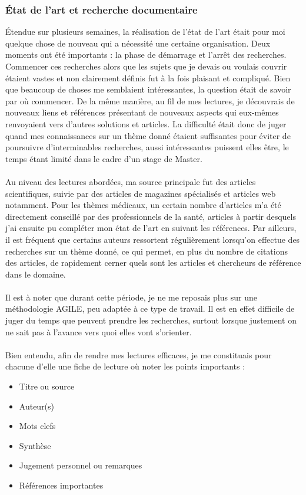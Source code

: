 	\subsubsection{État de l'art et recherche documentaire}
Étendue sur plusieurs semaines, la réalisation de l'état de l'art était pour moi quelque chose de nouveau qui a nécessité une certaine organisation. Deux moments ont été importants : la phase de démarrage et l'arrêt des recherches. Commencer ces recherches alors que les sujets que je devais ou voulais couvrir étaient vastes et non clairement définis fut à la fois plaisant et compliqué. Bien que beaucoup de choses me semblaient intéressantes, la question était de savoir par où commencer. De la même manière, au fil de mes lectures, je découvrais de nouveaux liens et références présentant de nouveaux aspects qui eux-mêmes renvoyaient vers d'autres solutions et articles. La difficulté était donc de juger quand mes connaissances sur un thème donné étaient suffisantes pour éviter de poursuivre d'interminables recherches, aussi intéressantes puissent elles être, le temps étant limité dans le cadre d'un stage de Master.

	\paragraph{}Au niveau des lectures abordées, ma source principale fut des articles scientifiques, suivie par des articles de magazines spécialisés et articles web notamment. Pour les thèmes médicaux, un certain nombre d'articles m'a été directement conseillé par des professionnels de la santé, articles à partir desquels j'ai ensuite pu compléter mon état de l'art en suivant les références. Par ailleurs, il est fréquent que certains auteurs ressortent régulièrement lorsqu'on effectue des recherches sur un thème donné, ce qui permet, en plus du nombre de citations des articles, de rapidement cerner quels sont les articles et chercheurs de référence dans le domaine.
	
\paragraph{}
Il est à noter que durant cette période, je ne me reposais plus sur une méthodologie AGILE, peu adaptée à ce type de travail. Il est en effet difficile de juger du temps que peuvent prendre les recherches, surtout lorsque justement on ne sait pas à l'avance vers quoi elles vont s'orienter.

	\paragraph{}Bien entendu, afin de rendre mes lectures efficaces, je me constituais pour chacune d'elle une fiche de lecture où noter les points importants : 
\begin{itemize}
	\item Titre ou source
	\item Auteur(s)
	\item Mots clefs
	\item Synthèse
	\item Jugement personnel ou remarques
	\item Références importantes
\end{itemize}